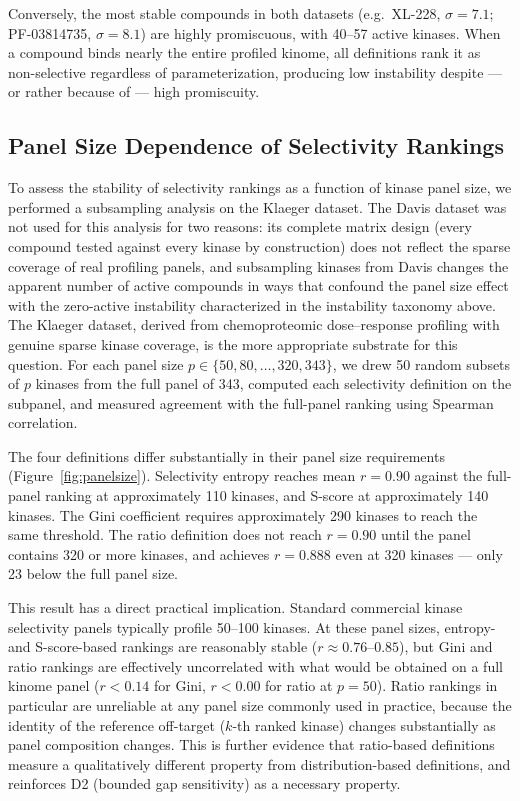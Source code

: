 \documentclass[journal=jcisd8,manuscript=article]{achemso}
\begin{document}
Conversely, the most stable compounds in both datasets (e.g.\ XL-228,
$\sigma = 7.1$; PF-03814735, $\sigma = 8.1$) are highly promiscuous, with
40--57 active kinases.
When a compound binds nearly the entire profiled kinome, all definitions rank
it as non-selective regardless of parameterization, producing low instability
despite --- or rather because of --- high promiscuity.

\subsection{Panel Size Dependence of Selectivity Rankings}
\label{sec:results:panelsize}

To assess the stability of selectivity rankings as a function of kinase panel
size, we performed a subsampling analysis on the Klaeger dataset.
The Davis dataset was not used for this analysis for two reasons: its complete
matrix design (every compound tested against every kinase by construction)
does not reflect the sparse coverage of real profiling panels, and subsampling
kinases from Davis changes the apparent number of active compounds in ways that
confound the panel size effect with the zero-active instability characterized
in the instability taxonomy above.
The Klaeger dataset, derived from chemoproteomic dose--response profiling with
genuine sparse kinase coverage, is the more appropriate substrate for this
question.
For each panel size $p \in \{50, 80, \ldots, 320, 343\}$, we drew 50 random
subsets of $p$ kinases from the full panel of 343, computed each selectivity
definition on the subpanel, and measured agreement with the full-panel ranking
using Spearman correlation.

The four definitions differ substantially in their panel size requirements
(Figure~\ref{fig:panelsize}).
Selectivity entropy reaches mean $r = 0.90$ against the full-panel ranking at
approximately 110 kinases, and S-score at approximately 140 kinases.
The Gini coefficient requires approximately 290 kinases to reach the same
threshold.
The ratio definition does not reach $r = 0.90$ until the panel contains 320
or more kinases, and achieves $r = 0.888$ even at 320 kinases --- only 23
below the full panel size.

This result has a direct practical implication.
Standard commercial kinase selectivity panels typically profile 50--100
kinases.\cite{Bosc2017}
At these panel sizes, entropy- and S-score-based rankings are reasonably
stable ($r \approx 0.76$--$0.85$), but Gini and ratio rankings are effectively
uncorrelated with what would be obtained on a full kinome panel
($r < 0.14$ for Gini, $r < 0.00$ for ratio at $p = 50$).
Ratio rankings in particular are unreliable at any panel size commonly used
in practice, because the identity of the reference off-target ($k$-th ranked
kinase) changes substantially as panel composition changes.
This is further evidence that ratio-based definitions measure a qualitatively
different property from distribution-based definitions, and reinforces D2
(bounded gap sensitivity) as a necessary property.
\end{document}
